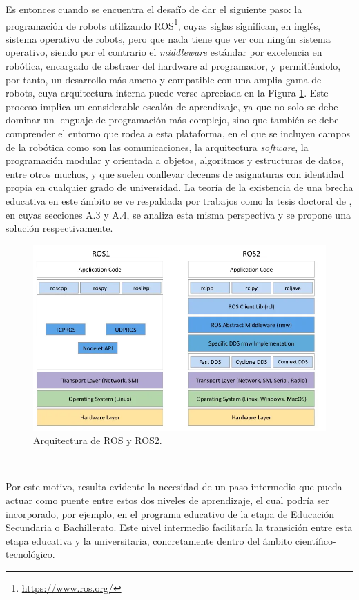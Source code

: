 Es entonces cuando se encuentra el desafío de dar el siguiente paso: la
programación de robots utilizando ROS\footnote{\url{https://www.ros.org/}},
cuyas siglas significan, en inglés, sistema operativo de robots, pero que nada
tiene que ver con ningún sistema operativo, siendo por el contrario el
\textit{middleware} estándar por excelencia en robótica, encargado de abstraer
del hardware al programador, y permitiéndolo, por tanto, un desarrollo más
ameno y compatible con una amplia gama de robots, cuya arquitectura interna
puede verse apreciada en la Figura \ref{fig:ros}.
Este proceso implica un considerable escalón de aprendizaje, ya que no solo se
debe dominar un lenguaje de programación más complejo, sino que también se debe
comprender el entorno que rodea a esta plataforma, en el que se incluyen campos
de la robótica como son las comunicaciones, la arquitectura \textit{software},
la programación modular y orientada a objetos, algoritmos y estructuras de
datos, entre otros muchos, y que suelen conllevar decenas de asignaturas con
identidad propia en cualquier grado de universidad.
La teoría de la existencia de una brecha educativa en este ámbito se ve
respaldada por trabajos como la tesis doctoral de \cite{vega2018}, en cuyas
secciones A.3 y A.4, se analiza esta misma perspectiva y se propone una solución
respectivamente.

\begin{figure} [h!]
  \begin{center}
    \includegraphics[width=12cm]{figs/ROS_and_ROS2}
  \end{center}
  \caption{Arquitectura de ROS y ROS2.}
  \label{fig:ros}
\end{figure}\

Por este motivo, resulta evidente la necesidad de un paso intermedio que pueda
actuar como puente entre estos dos niveles de aprendizaje, el cual podría ser
incorporado, por ejemplo, en el programa educativo de la etapa de Educación
Secundaria o Bachillerato.
Este nivel intermedio facilitaría la transición entre esta etapa educativa y la
universitaria, concretamente dentro del ámbito científico-tecnológico.



